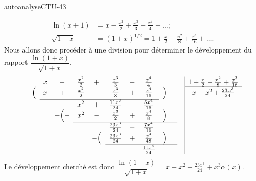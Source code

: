 \begin{corrige}{autoanalyseCTU-43}
\begin{enumerate}
    \begin{equation*}
      \begin{aligned}
        \ln(x+1) &= x -\frac{x^2}{2} + \frac{x^3}{3} -\frac{x^4}{4} + \ldots ;\\
        \sqrt{1+x} & = (1+x)^{1/2}  = 1+ \frac{x}{2} -\frac{x^2}{8} + \frac{x^3}{16} + \ldots .
      \end{aligned}
    \end{equation*}
    Nous allons donc procéder à une division pour déterminer le développement du rapport $\dfrac{\ln(1+x)}{\sqrt{1+x}}$. 
    \begin{equation*}
        \begin{array}[]{ccccccccccc|c}
            &x&-&\frac{x^2}{ 2 }&+&\frac{x^3}{ 3 }& -& \frac{x^4}{4}&&&&1+\frac{ x }{2}-\frac{x^2}{ 8 }+ \frac{x^3}{16}\\
            \cline{12-12}
            -\Big( &x&+&\frac{ x^2 }{2}&-&\frac{x^3}{ 8 }&+& \frac{x^4}{16}&\Big) && &x-x^2+\frac{23x^3}{ 24 }\\
            \cline{2-8}
            & &- &x^2&+&\frac{11x^3}{ 24 }&- & \frac{5x^4}{16}& & && \\
            &&-\Big( - &x^2&-&\frac{x^3}{ 2 }&+&\frac{x^4}{ 8 }&\Big) & & \\
            \cline{4-10}
            & & & & &\frac{ 23x^3}{ 24 }&-&\frac{7x^4}{ 16 }& & & \\
            & & &  &-\Big(  &\frac{23 x^3 }{ 24 }&+&\frac{x^4}{ 48 }&\Big)& && \\
            \cline{6-10}
            & & & & & &- &\frac{11x^4}{24} &&&& \\
        \end{array}
    \end{equation*}
 Le développement cherché est donc $\dfrac{\ln(1+x)}{\sqrt{1+x}}=x-x^2+\frac{23x^3}{ 24 }+ x^3\alpha(x)$.
  \end{enumerate}
 
\end{corrige}   
